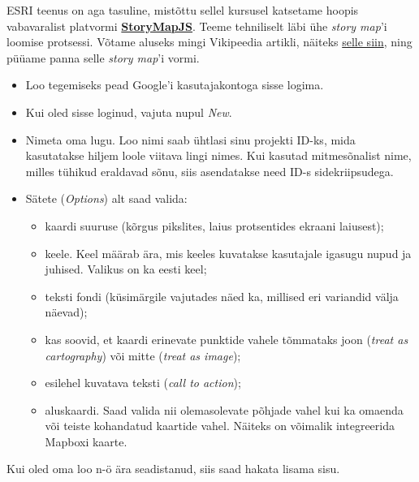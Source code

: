 \documentclass[
]{book}
\providecommand{\tightlist}{%
  \setlength{\itemsep}{0pt}\setlength{\parskip}{0pt}}
\begin{document}
ESRI teenus on aga tasuline, mistõttu sellel kursusel katsetame hoopis vabavaralist platvormi \textbf{\href{https://storymap.knightlab.com/}{StoryMapJS}}. Teeme tehniliselt läbi ühe \emph{story map}'i loomise protsessi. Võtame aluseks mingi Vikipeedia artikli, näiteks \href{https://en.wikipedia.org/wiki/Janis_Joplin}{selle siin}, ning püüame panna selle \emph{story map}'i vormi.\\

\begin{itemize}
\tightlist
\item
  Loo tegemiseks pead Google'i kasutajakontoga sisse logima.\\
\item
  Kui oled sisse loginud, vajuta nupul \emph{New}.\\
\item
  Nimeta oma lugu. Loo nimi saab ühtlasi sinu projekti ID-ks, mida kasutatakse hiljem loole viitava lingi nimes. Kui kasutad mitmesõnalist nime, milles tühikud eraldavad sõnu, siis asendatakse need ID-s sidekriipsudega.\\
\item
  Sätete (\emph{Options}) alt saad valida:

  \begin{itemize}
  \tightlist
  \item
    kaardi suuruse (kõrgus pikslites, laius protsentides ekraani laiusest);
  \item
    keele. Keel määrab ära, mis keeles kuvatakse kasutajale igasugu nupud ja juhised. Valikus on ka eesti keel;\\
  \item
    teksti fondi (küsimärgile vajutades näed ka, millised eri variandid välja näevad);\\
  \item
    kas soovid, et kaardi erinevate punktide vahele tõmmataks joon (\emph{treat as cartography}) või mitte (\emph{treat as image});\\
  \item
    esilehel kuvatava teksti (\emph{call to action});\\
  \item
    aluskaardi. Saad valida nii olemasolevate põhjade vahel kui ka omaenda või teiste kohandatud kaartide vahel. Näiteks on võimalik integreerida Mapboxi kaarte.
  \end{itemize}
\end{itemize}

Kui oled oma loo n-ö ära seadistanud, siis saad hakata lisama sisu.
\end{document}
